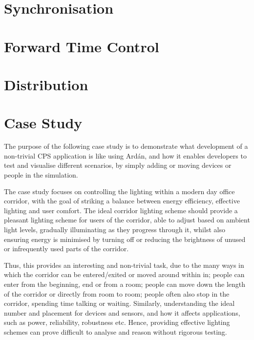 \section{Synchronisation} %
\label{sec:synchronisation}




\section{Forward Time Control} %
\label{sec:time_control}

\section{Distribution} %
\label{sec:distribution}


\section{Case Study}
\label{sec:Case Study: Corridor}

The purpose of the following case study is to demonstrate what development of a non-trivial CPS application is like using Ard\'{a}n, and how it enables developers to test and visualise different scenarios, by simply adding or moving devices or people in the simulation.

The case study focuses on controlling the lighting within a modern day office corridor, with the goal of striking a balance between energy efficiency, effective lighting and user comfort. The ideal corridor lighting scheme should provide a pleasant lighting scheme for users of the corridor, able to adjust based on ambient light levels, gradually illuminating as they progress through it, whilst also ensuring energy is minimised by turning off or reducing the brightness of unused or infrequently used parts of the corridor.

Thus, this provides an interesting and non-trivial task, due to the many ways in which the corridor can be entered/exited or moved around within in; people can enter from the beginning, end or from a room; people can move down the length of the corridor or directly from room to room; people often also stop in the corridor, spending time talking or waiting. Similarly, understanding the ideal number and placement for devices and sensors, and how it affects applications, such as power, reliability, robustness etc. Hence, providing effective lighting schemes can prove difficult to analyse and reason without rigorous testing.

